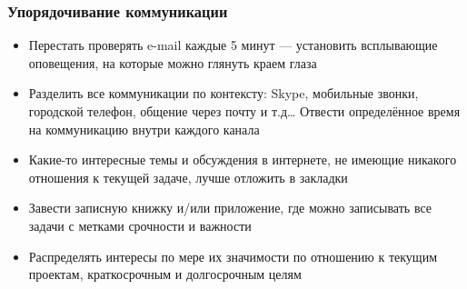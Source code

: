 \documentclass{../industrial-development}
\begin{document}
\begin{frame} \frametitle{Упорядочивание коммуникации}
  \begin{itemize}
  \item Перестать проверять e-mail каждые 5 минут --- установить всплывающие оповещения, на которые можно глянуть краем глаза
  \item Разделить все коммуникации по контексту: Skype, мобильные звонки, городской телефон, общение через почту и т.д… Отвести определённое время на коммуникацию внутри каждого канала
  \item Какие-то интересные темы и обсуждения в интернете, не имеющие никакого отношения к текущей задаче, лучше отложить в закладки
  \item Завести записную книжку и/или приложение, где можно записывать все задачи с метками срочности и важности
  \item Распределять интересы по мере их значимости по отношению к текущим проектам, краткосрочным и долгосрочным целям
  \end{itemize}
\end{frame}

\lecturenotes
\end{document}
